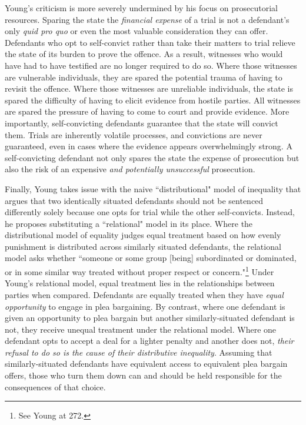 Young's criticism is more severely undermined by his focus on prosecutorial resources. Sparing the state the \textit{financial expense} of a trial is not a defendant's only \textit{quid pro quo} or even the most valuable consideration they can offer. Defendants who opt to self-convict rather than take their matters to trial relieve the state of its burden to prove the offence. As a result, witnesses who would have had to have testified are no longer required to do so. Where those witnesses are vulnerable individuals, they are spared the potential trauma of having to revisit the offence. Where those witnesses are unreliable individuals, the state is spared the difficulty of having to elicit evidence from hostile parties. All witnesses are spared the pressure of having to come to court and provide evidence. More importantly, self-convicting defendants guarantee that the state will convict them. Trials are inherently volatile processes, and convictions are never guaranteed, even in cases where the evidence appears overwhelmingly strong. A self-convicting defendant not only spares the state the expense of prosecution but also the risk of an expensive \textit{and potentially unsuccessful} prosecution.

Finally, Young takes issue with the naive ``distributional" model of inequality that argues that two identically situated defendants should not be sentenced differently solely because one opts for trial while the other self-convicts. Instead, he proposes substituting a ``relational" model in its place. Where the distributional model of equality judges equal treatment based on how evenly punishment is distributed across similarly situated defendants, the relational model asks whether ``someone or some group [being] subordinated or dominated, or in some similar way treated without proper respect or concern."\footnote{See Young at 272.} Under Young's relational model, equal treatment lies in the relationships between parties when compared. Defendants are equally treated when they have \textit{equal opportunity} to engage in plea bargaining. By contrast, where one defendant is given an opportunity to plea bargain but another similarly-situated defendant is not, they receive unequal treatment under the relational model. Where one defendant opts to accept a deal for a lighter penalty and another does not, \textit{their refusal to do so is the cause of their distributive inequality}. Assuming that similarly-situated defendants have equivalent access to equivalent plea bargain offers, those who turn them down can and should be held responsible for the consequences of that choice.

